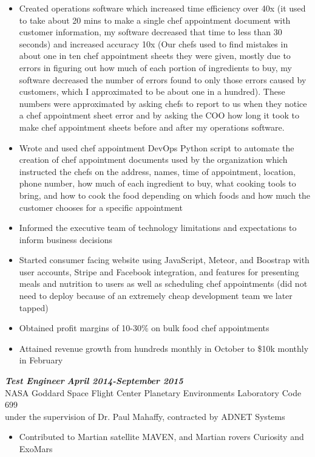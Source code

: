 \documentclass{res}
\begin{document}
\begin{resume}
\begin{itemize}
		\item Created operations software which increased time efficiency over 40x (it used to take about 20 mins to make a single chef appointment document with customer information, my software decreased that time to less than 30 seconds) and increased accuracy 10x (Our chefs used to find mistakes in about one in ten chef appointment sheets they were given, mostly due to errors in figuring out how much of each portion of ingredients to buy, my software decreased the number of errors found to only those errors caused by customers, which I approximated to be about one in a hundred). These numbers were approximated by asking chefs to report to us when they notice a chef appointment sheet error and by asking the COO how long it took to make chef appointment sheets before and after my operations software.
		\item Wrote and used chef appointment DevOps Python script to automate the creation of chef appointment documents used by the organization which instructed the chefs on the address, names, time of appointment, location, phone number, how much of each ingredient to buy, what cooking tools to bring, and how to cook the food depending on which foods and how much the customer chooses for a specific appointment
		\item Informed the executive team of technology limitations and expectations to inform business decisions
		\item Started consumer facing website using JavaScript, Meteor, and Boostrap with user accounts, Stripe and Facebook integration, and features for presenting meals and nutrition to users as well as scheduling chef appointments (did not need to deploy because of an extremely cheap development team we later tapped)
                \item Obtained profit margins of 10-30\% on bulk food chef appointments
		\item Attained revenue growth from hundreds monthly in October to \$10k monthly in February
                \end{itemize}
	{\bfseries {\em Test Engineer}}  \hfill  {\bfseries{\em April 2014-September 2015}}\\
		NASA Goddard Space Flight Center Planetary Environments Laboratory Code 699\\
                under the supervision of Dr. Paul Mahaffy, contracted by ADNET Systems
                \begin{itemize}  \itemsep -2pt %
                \item Contributed to Martian satellite MAVEN, and Martian rovers Curiosity and ExoMars

\end{itemize}
\end{resume}
\end{document}

